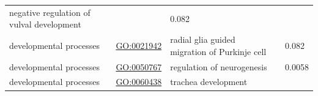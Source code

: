 \documentclass[
]{article}
\begin{document}
\begin{longtable}[]{@{}lllll@{}}
\begin{minipage}[t]{0.17\columnwidth}
negative regulation of vulval development\strut
\end{minipage} & \begin{minipage}[t]{0.17\columnwidth}\raggedright
\strut
\end{minipage} & \begin{minipage}[t]{0.17\columnwidth}\raggedright
0.082\strut
\end{minipage}\tabularnewline
\begin{minipage}[t]{0.17\columnwidth}\raggedright
developmental processes\strut
\end{minipage} & \begin{minipage}[t]{0.17\columnwidth}\raggedright
\url{GO:0021942}\strut
\end{minipage} & \begin{minipage}[t]{0.17\columnwidth}\raggedright
radial glia guided migration of Purkinje cell\strut
\end{minipage} & \begin{minipage}[t]{0.17\columnwidth}\raggedright
\strut
\end{minipage} & \begin{minipage}[t]{0.17\columnwidth}\raggedright
0.082\strut
\end{minipage}\tabularnewline
\begin{minipage}[t]{0.17\columnwidth}\raggedright
developmental processes\strut
\end{minipage} & \begin{minipage}[t]{0.17\columnwidth}\raggedright
\url{GO:0050767}\strut
\end{minipage} & \begin{minipage}[t]{0.17\columnwidth}\raggedright
regulation of neurogenesis\strut
\end{minipage} & \begin{minipage}[t]{0.17\columnwidth}\raggedright
\strut
\end{minipage} & \begin{minipage}[t]{0.17\columnwidth}\raggedright
0.0058\strut
\end{minipage}\tabularnewline
\begin{minipage}[t]{0.17\columnwidth}\raggedright
developmental processes\strut
\end{minipage} & \begin{minipage}[t]{0.17\columnwidth}\raggedright
\url{GO:0060438}\strut
\end{minipage} & \begin{minipage}[t]{0.17\columnwidth}\raggedright
trachea development\strut

\end{minipage}
\end{longtable}
\end{document}
